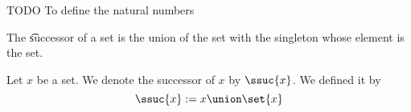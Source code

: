 

TODO
To define the natural numbers


The \t{successor} of a set is the union of the set with the singleton whose element is the set.


Let $x$ be a set.
We denote the successor of $x$ by $\ssuc{x}$.
We defined it by
$$
  \ssuc{x} := x \union \set{x}
$$

